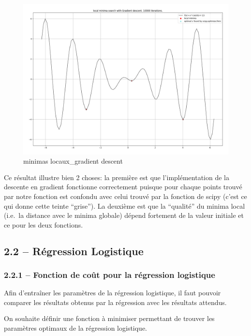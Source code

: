\documentclass[
]{article}
\begin{document}
\begin{figure}
\centering
\includegraphics[width=1\textwidth,height=\textheight]{../res/3.1_gradient_descent_minima.png}
\caption{minimas locaux\_gradient descent}
\end{figure}

Ce résultat illustre bien 2 choses: la première est que l'implémentation
de la descente en gradient fonctionne correctement puisque pour chaque
points trouvé par notre fonction est confondu avec celui trouvé par la
fonction de scipy (c'est ce qui donne cette teinte ``grise''). La
deuxième est que la ``qualité'' du minima local (i.e.~la distance avec
le minima globale) dépend fortement de la valeur initiale et ce pour les
deux fonctions.

\newpage{}

\subsection{2.2 -- Régression
Logistique}\label{ruxe9gression-logistique-1}

\subsubsection{2.2.1 -- Fonction de coût pour la régression
logistique}\label{fonction-de-couxfbt-pour-la-ruxe9gression-logistique}

Afin d'entraîner les paramètres de la régression logistique, il faut
pouvoir comparer les résultats obtenus par la régression avec les
résultats attendus.

On souhaite définir une fonction à minimiser permettant de trouver les
paramètres optimaux de la régression logistique.
\end{document}
